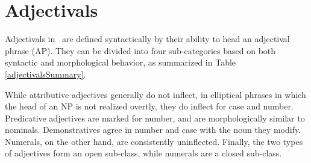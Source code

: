 


\chapter{Adjectivals}\label{adjectivesIntro}%
Adjectivals in \PS\ are defined syntactically by their ability to head an adjectival phrase (AP). They can be divided into four sub-categories based on both syntactic and morphological behavior, as summarized in Table \vref{adjectivalsSummary}.
\begin{table}\centering
\caption{Summary of syntactic and morphological features for the four types of adjectivals}\label{adjectivalsSummary}
\resizebox{\columnwidth}{!}{
\begin{tabular}{c p{140pt} p{140pt}}%
					&\MC{1}{c}{\It{syntax}}		&\MC{1}{c}{\It{morphology}}	\\\hline
\It{attributive adjectives}	& attributive position within an NP	& no inflection (except in elliptic constructions)\\\hline%
\It{predicative adjectives}	& predicative position (complement of \It{årrot} ‘be’)	&inflect for number\\\hline%
\It{demonstratives}		& initial attributive position within an NP	& inflect for number \& case\\\hline%
\It{numerals}			& attributive or predicative position	& never inflect\\\hline
\end{tabular}}
\end{table}

While attributive adjectives generally do not inflect, in elliptical phrases in which the head of an NP is not realized overtly, they do inflect for case and number. 
Predicative adjectives are marked for number, and are morphologically similar to nominals. 
Demonstratives agree in number and case with the noun they modify. 
Numerals, on the other hand, are consistently uninflected. 
Finally, the two types of adjectives form an open sub-class, while numerals are a closed sub-class. 

